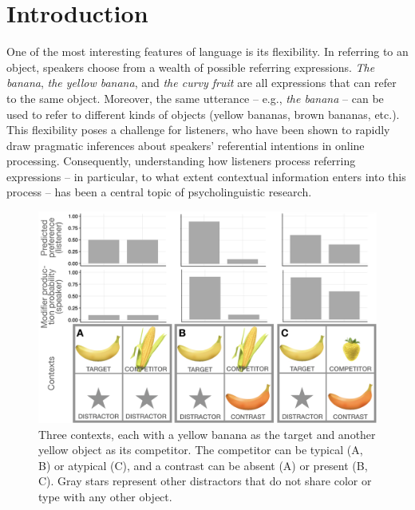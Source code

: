 \documentclass[10pt,letterpaper]{article}
\begin{document}
\section{Introduction}

One of the most interesting features of language is its flexibility. In referring to an object, speakers choose from a wealth of possible referring expressions. \textit{The banana}, \textit{the yellow banana}, and \textit{the curvy fruit} are all expressions that can refer to the same object. Moreover, the same utterance -- e.g., \textit{the banana} -- can be used to refer to different kinds of objects (yellow bananas, brown bananas, etc.). This flexibility poses a challenge for listeners, who have been shown to rapidly draw pragmatic inferences about speakers' referential intentions in online processing. Consequently, understanding how listeners process referring expressions -- in particular, to what extent contextual information enters into this process -- has been a central topic of psycholinguistic research.

\begin{figure}
	\begin{center}
		\includegraphics[width=.475\textwidth]{graphs/example-context.pdf}
	\end{center}
\caption{Three contexts, each with a yellow banana as the target and another yellow object as its competitor. The competitor can be typical (A, B) or atypical (C), and a contrast can be absent (A) or present (B, C). Gray stars represent other distractors that do not share color or type with any other object.} 
\label{example-context}
\end{figure}
\end{document}
